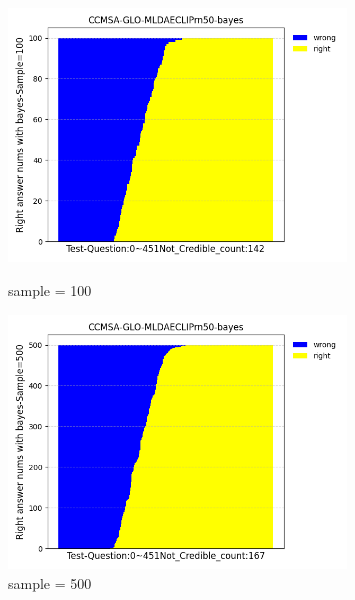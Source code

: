 \begin{figure}[htbp]
	\begin{minipage}{0.5\linewidth}
		\centering	
		\includegraphics[width=0.8\textwidth]{Fig/myfig/chapter4/sample100.png}  %
		\caption{\label{modal_bayes_medrad}sample = 100} 	
	\end{minipage}
	\begin{minipage}{0.5\linewidth}
		\centering	
		\includegraphics[width=0.8\textwidth]{Fig/myfig/chapter4/sample500.png}  %
		\caption{\label{modal_bayes_slake}sample = 500} 	
	\end{minipage}	
\end{figure}
%
